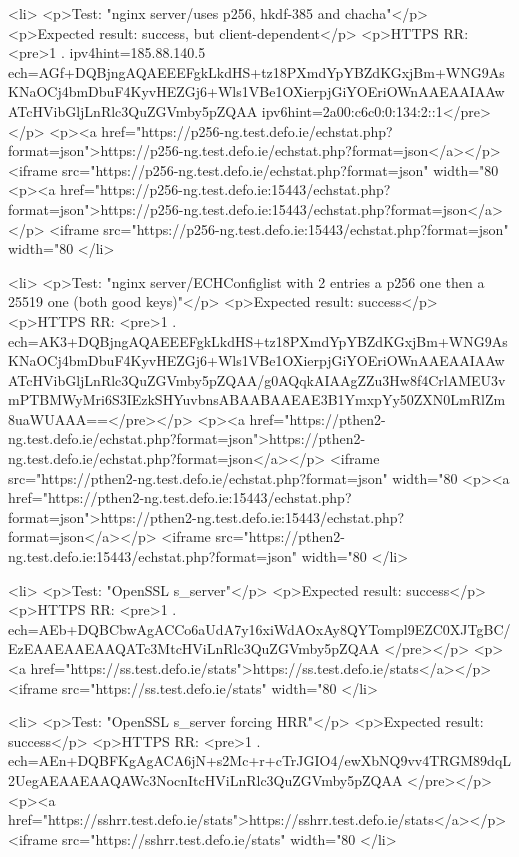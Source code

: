 <li>
<p>Test: "nginx server/uses p256, hkdf-385 and chacha"</p>
<p>Expected result: success, but client-dependent</p>
<p>HTTPS RR: <pre>1 . ipv4hint=185.88.140.5 ech=AGf+DQBjngAQAEEEFgkLkdHS+tz18PXmdYpYBZdKGxjBm+WNG9AsKNaOCj4bmDbuF4KyvHEZGj6+Wls1VBe1OXierpjGiYOEriOWnAAEAAIAAwATcHVibGljLnRlc3QuZGVmby5pZQAA ipv6hint=2a00:c6c0:0:134:2::1</pre></p>
<p><a href="https://p256-ng.test.defo.ie/echstat.php?format=json">https://p256-ng.test.defo.ie/echstat.php?format=json</a></p>
<iframe src="https://p256-ng.test.defo.ie/echstat.php?format=json" width="80%
<p><a href="https://p256-ng.test.defo.ie:15443/echstat.php?format=json">https://p256-ng.test.defo.ie:15443/echstat.php?format=json</a></p>
<iframe src="https://p256-ng.test.defo.ie:15443/echstat.php?format=json" width="80%
</li>

<li>
<p>Test: "nginx server/ECHConfiglist with 2 entries a p256 one then a 25519 one (both good keys)"</p>
<p>Expected result: success</p>
<p>HTTPS RR: <pre>1 . ech=AK3+DQBjngAQAEEEFgkLkdHS+tz18PXmdYpYBZdKGxjBm+WNG9AsKNaOCj4bmDbuF4KyvHEZGj6+Wls1VBe1OXierpjGiYOEriOWnAAEAAIAAwATcHVibGljLnRlc3QuZGVmby5pZQAA/g0AQqkAIAAgZZu3Hw8f4CrlAMEU3vmPTBMWyMri6S3IEzkSHYuvbnsABAABAAEAE3B1YmxpYy50ZXN0LmRlZm8uaWUAAA==</pre></p>
<p><a href="https://pthen2-ng.test.defo.ie/echstat.php?format=json">https://pthen2-ng.test.defo.ie/echstat.php?format=json</a></p>
<iframe src="https://pthen2-ng.test.defo.ie/echstat.php?format=json" width="80%
<p><a href="https://pthen2-ng.test.defo.ie:15443/echstat.php?format=json">https://pthen2-ng.test.defo.ie:15443/echstat.php?format=json</a></p>
<iframe src="https://pthen2-ng.test.defo.ie:15443/echstat.php?format=json" width="80%
</li>

<li>
<p>Test: "OpenSSL s_server"</p>
<p>Expected result: success</p>
<p>HTTPS RR: <pre>1 . ech=AEb+DQBCbwAgACCo6aUdA7y16xiWdAOxAy8QYTompl9EZC0XJTgBC/EzEAAEAAEAAQATc3MtcHViLnRlc3QuZGVmby5pZQAA
</pre></p>
<p><a href="https://ss.test.defo.ie/stats">https://ss.test.defo.ie/stats</a></p>
<iframe src="https://ss.test.defo.ie/stats" width="80%
</li>

<li>
<p>Test: "OpenSSL s_server forcing HRR"</p>
<p>Expected result: success</p>
<p>HTTPS RR: <pre>1 . ech=AEn+DQBFKgAgACA6jN+s2Mc+r+cTrJGIO4/ewXbNQ9vv4TRGM89dqL2UegAEAAEAAQAWc3NocnItcHViLnRlc3QuZGVmby5pZQAA
</pre></p>
<p><a href="https://sshrr.test.defo.ie/stats">https://sshrr.test.defo.ie/stats</a></p>
<iframe src="https://sshrr.test.defo.ie/stats" width="80%
</li>

